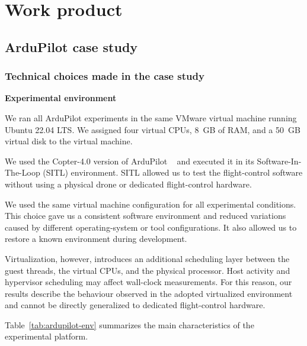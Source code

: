 \section{Work product}

\subsection{ArduPilot case study} 
\subsubsection{Technical choices made in the case study}
\leavevmode\par
\noindent \textbf{Experimental environment}

\noindent We ran all ArduPilot experiments in the same VMware virtual machine running Ubuntu 22.04 LTS. We assigned four virtual CPUs, 8~GB of RAM, and a 50~GB virtual disk to the virtual machine.

\noindent We used the Copter-4.0 version of ArduPilot ~\cite{ardupilot_copter4.0} and executed it in its Software-In-The-Loop (SITL) environment. SITL allowed us to test the flight-control software without using a physical drone or dedicated flight-control hardware.

\noindent We used the same virtual machine configuration for all experimental conditions. This choice gave us a consistent software environment and reduced variations caused by different operating-system or tool configurations. It also allowed us to restore a known environment during development.

\noindent Virtualization, however, introduces an additional scheduling layer between the guest threads, the virtual CPUs, and the physical processor. Host activity and hypervisor scheduling may affect wall-clock measurements. For this reason, our results describe the behaviour observed in the adopted virtualized environment and cannot be directly generalized to dedicated flight-control hardware.

\noindent Table~\ref{tab:ardupilot-env} summarizes the main characteristics of the experimental platform.


